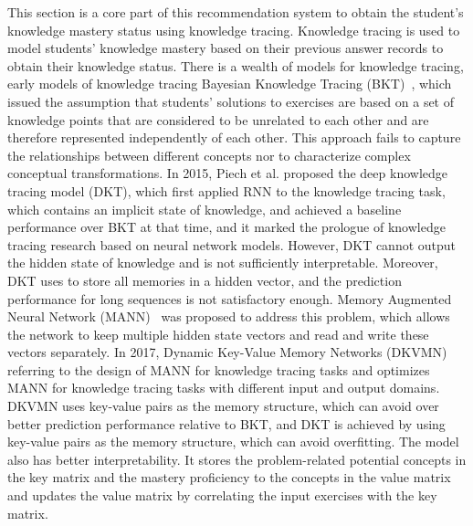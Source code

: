 This section is a core part of this recommendation system to obtain the student's knowledge mastery status using knowledge tracing. Knowledge tracing is used to model students' knowledge mastery based on their previous answer records to obtain their knowledge status. There is a wealth of models for knowledge tracing, early models of knowledge tracing Bayesian Knowledge Tracing (BKT)~\cite{yudelson2013individualized}, which issued the assumption that students' solutions to exercises are based on a set of knowledge points that are considered to be unrelated to each other and are therefore represented independently of each other. This approach fails to capture the relationships between different concepts nor to characterize complex conceptual transformations. In 2015, Piech et al. proposed the deep knowledge tracing model (DKT), which first applied RNN to the knowledge tracing task, which contains an implicit state of knowledge, and achieved a baseline performance over BKT at that time, and it marked the prologue of knowledge tracing research based on neural network models. However, DKT cannot output the hidden state of knowledge and is not sufficiently interpretable.
Moreover, DKT uses to store all memories in a hidden vector, and the prediction performance for long sequences is not satisfactory enough. Memory Augmented Neural Network (MANN)~\cite{santoro2016meta} was proposed to address this problem, which allows the network to keep multiple hidden state vectors and read and write these vectors separately. In 2017, Dynamic Key-Value Memory Networks (DKVMN)~\cite{zhang2017dynamic} referring to the design of MANN for knowledge tracing tasks and optimizes MANN for knowledge tracing tasks with different input and output domains. DKVMN uses key-value pairs as the memory structure, which can avoid over better prediction performance relative to BKT, and DKT is achieved by using key-value pairs as the memory structure, which can avoid overfitting. The model also has better interpretability. It stores the problem-related potential concepts in the key matrix and the mastery proficiency to the concepts in the value matrix and updates the value matrix by correlating the input exercises with the key matrix.

